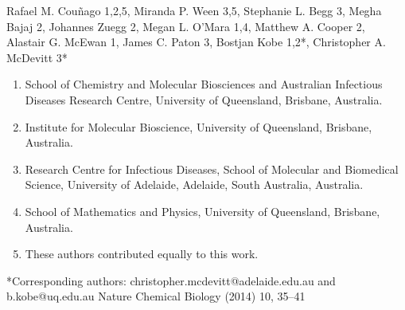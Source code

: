 Rafael M. Couñago 1,2,5, Miranda P. Ween 3,5, Stephanie L. Begg 3, Megha Bajaj 2, Johannes Zuegg 2, Megan L. O’Mara 1,4, Matthew A. Cooper 2, Alastair G. McEwan 1, James C. Paton 3, Bostjan Kobe 1,2*, Christopher A. McDevitt 3*
\begin{enumerate}
\item School of Chemistry and Molecular Biosciences and Australian Infectious Diseases Research Centre, University of Queensland, Brisbane, Australia.
\item Institute for Molecular Bioscience, University of Queensland, Brisbane, Australia.
\item Research Centre for Infectious Diseases, School of Molecular and Biomedical Science, University of Adelaide, Adelaide, South Australia, Australia.
\item School of Mathematics and Physics, University of Queensland, Brisbane, Australia.
\item These authors contributed equally to this work.
\end{enumerate}

*Corresponding authors: christopher.mcdevitt@adelaide.edu.au and b.kobe@uq.edu.au
Nature Chemical Biology (2014) 10, 35–41